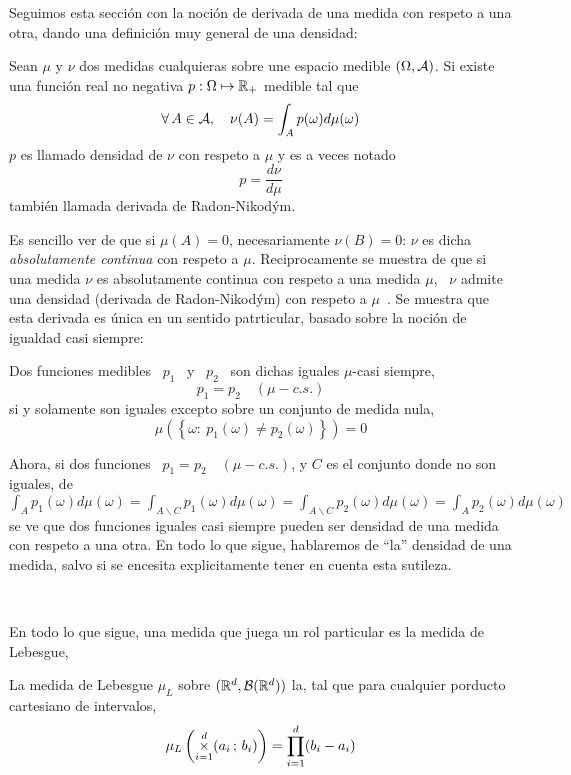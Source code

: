 Seguimos esta secci\'on con la noci\'on  de derivada de una medida con respeto a
una otra, dando una definici\'on muy general de una densidad:
%
\begin{definicion}\label{def:MP:DensidadMedida}
  Sean  $\mu$  y  $\nu$  dos  medidas  cualquieras  sobre  une  espacio  medible
  $(\Omega,\mathcal{A})$.  Si  existe una funci\'on  real no negativa $p:  \Omega \mapsto
  \mathbb{R}_+$ medible tal que
  \[
  \forall \, A \in \mathcal{A}, \quad \nu(A) = \int_A p(\omega) d\mu(\omega)
  \]
  $p$ es llamado densidad de $\nu$ con respeto a $\mu$ y es a veces notado
  \[
  p = \frac{d\nu}{d\mu}
  \]
  tambi\'en llamada derivada de Radon-Nikod\'ym.
\end{definicion}
%
Es sencillo ver  de que si $\mu(A)  = 0$, necesariamente $\nu(B) =  0$: $\nu$ es
dicha  {\it  absolutamente continua}  con  respeto  a  $\mu$. Reciprocamente  se
muestra de que  si una medida $\nu$ es absolutamente continua  con respeto a una
medida  $\mu$, \  $\nu$ admite  una densidad  (derivada de  Radon-Nikod\'ym) con
respeto a  $\mu$~\cite{Nyk30, AthLah06, Bog07:v1,  Coh13}.  Se muestra  que esta
derivada  es \'unica  en un  sentido patrticular,  basado sobre  la  noci\'on de
igualdad casi siempre:

\begin{definicion}
  Dos funciones  medibles \ $p_1$  \ y \  $p_2$ \ son dichas  iguales $\mu$-casi
  siempre,
  \[
  p_1 = p_2 \quad (\mu-c.s.)
  \]
  si y solamente son iguales excepto sobre un conjunto de medida nula,
  \[
  \mu\left( \left\{ \omega: \: p_1(\omega) \ne p_2(\omega) \right\} \right) = 0
  \]
\end{definicion}
%
\noindent Ahora, si  dos funciones \ $p_1  = p_2 \quad (\mu-c.s.)$, y  $C$ es el
conjunto  donde   no  son  iguales,  de  \   $\displaystyle  \int_A  p_1(\omega)
d\mu(\omega) = \int_{A\backslash C} p_1(\omega) d\mu(\omega) = \int_{A\backslash
  C} p_2(\omega) d\mu(\omega)  = \int_A p_2(\omega) d\mu(\omega)$ se  ve que dos
funciones iguales casi  siempre pueden ser densidad de una  medida con respeto a
una otra.   En todo lo que sigue,  hablaremos de ``la'' densidad  de una medida,
salvo si se encesita explicitamente tener en cuenta esta sutileza.

\

En todo lo que sigue, una medida que juega un rol particular es la medida de Lebesgue,
%
\begin{definicion}
  La medida de  Lebesgue $\mu_L$ sobre $(\mathbb{R}^d,\mathcal{B}(\mathbb{R}^d))$ la,  tal que para
  cualquier porducto cartesiano de intervalos,
  \[
  \mu_L\left(  \operatorname*{\times}_{i=1}^d  (a_i  \,  ;  \, b_i)  \right)  =  \prod_{i=1}^d
  (b_i-a_i)
  \]
\end{definicion}

